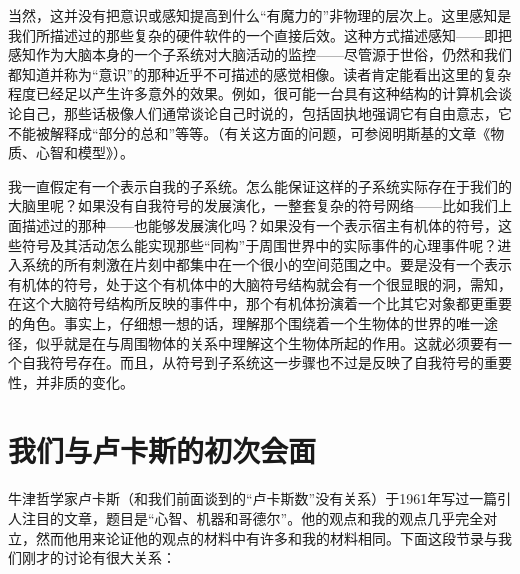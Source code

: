 当然，这并没有把意识或感知提高到什么“有魔力的”非物理的层次上。这里感知是我们所描述过的那些复杂的硬件软件的一个直接后效。这种方式描述感知——即把感知作为大脑本身的一个子系统对大脑活动的监控——尽管源于世俗，仍然和我们都知道并称为“意识”的那种近乎不可描述的感觉相像。读者肯定能看出这里的复杂程度已经足以产生许多意外的效果。例如，很可能一台具有这种结构的计算机会谈论自己，那些话极像人们通常谈论自己时说的，包括固执地强调它有自由意志，它不能被解释成“部分的总和”等等。（有关这方面的问题，可参阅明斯基的文章《物质、心智和模型》）。

我一直假定有一个表示自我的子系统。怎么能保证这样的子系统实际存在于我们的大脑里呢？如果没有自我符号的发展演化，一整套复杂的符号网络——比如我们上面描述过的那种——也能够发展演化吗？如果没有一个表示宿主有机体的符号，这些符号及其活动怎么能实现那些“同构”于周围世界中的实际事件的心理事件呢？进入系统的所有刺激在片刻中都集中在一个很小的空间范围之中。要是没有一个表示有机体的符号，处于这个有机体中的大脑符号结构就会有一个很显眼的洞，需知，在这个大脑符号结构所反映的事件中，那个有机体扮演着一个比其它对象都更重要的角色。事实上，仔细想一想的话，理解那个围绕着一个生物体的世界的唯一途径，似乎就是在与周围物体的关系中理解这个生物体所起的作用。这就必须要有一个自我符号存在。而且，从符号到子系统这一步骤也不过是反映了自我符号的重要性，并非质的变化。

\section{我们与卢卡斯的初次会面}

牛津哲学家卢卡斯（和我们前面谈到的“卢卡斯数”没有关系）于1961年写过一篇引人注目的文章，题目是“心智、机器和哥德尔”。他的观点和我的观点几乎完全对立，然而他用来论证他的观点的材料中有许多和我的材料相同。下面这段节录与我们刚才的讨论有很大关系：

